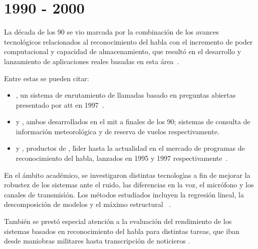 \section{1990 - 2000}
\label{sec:90s}

La d\'ecada de los 90 se vio marcada por la combinaci\'on de los avances tecnol\'ogicos relacionados al reconocimiento del habla con el incremento de poder computacional y capacidad de almacenamiento, que result\'o en el desarrollo y
lanzamiento de aplicaciones reales basadas en esta \mbox{\'area \cite{JuangAutomaticSpeech, GauvainLarge2000}}.

Entre estas se pueden citar:
\begin{itemize}
\item {}, un sistema de enrutamiento de llamadas basado en preguntas abiertas presentado por 
\gls{att} en \mbox{1997 \cite{Sachs97howmay}}. 

\item {} y , ambos desarrollados en el \gls{mit} a finales de los 90; sistemas de consulta de informaci\'on meteorol\'ogica \cite{ZueJupiter2000} y  de reserva de vuelos \cite{Seneff2000Dialogue} respectivamente.

\item {} y , productos de , l{\'\i}der hasta la actualidad en el mercado de programas de reconocimiento del habla, lanzados en 1995 y 1997 
\mbox{respectivamente \cite{BarnettMultilingual1996, BlandingSpeechless2012}}.
\end{itemize}

En el \'ambito acad\'emico, se investigaron distintas tecnolog{\'\i}as a fin de mejorar la robustez de los sistemas ante el ruido, las diferencias en la voz, el micr\'ofono y los canales de transmis{\'\i}\'on. Los m\'etodos estudiados incluyen la regresi\'on lineal,
la descomposici\'on de modelos y el m\'aximo estructural \mbox{ \cite{AnusuyaSpeech2009}}.

Tambi\'en se prest\'o especial atenci\'on a la evaluaci\'on del rendimiento de los sistemas basados en reconocimiento del habla para distintas tareas, que iban desde maniobras militares hasta transcripci\'on de noticieros \cite{JuangAutomaticSpeech}.
